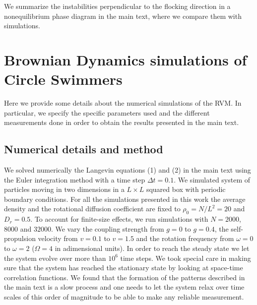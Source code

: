 \documentclass[aps,twocolumn,showlabels,showrefs,amsmath,amssymb,pre,superscriptaddress, floatfix, colors]{revtex4}
\newcommand{\1}{\begin{equation}}
\newcommand{\2}{\end{equation}}
\newcommand{\4}[2]{{\frac{#1}{#2}}}
\begin{document}
We summarize the instabilities perpendicular to the flocking direction in a nonequilibrium phase diagram in the main text, where we compare them with simulations. 





\section{Brownian Dynamics simulations of Circle Swimmers}

Here we provide some details about the numerical simulations of the RVM. In particular, we specify the specific parameters used and the different measurements done in order to obtain the results presented in the main text.

\subsection{Numerical details and method}

We solved numerically the Langevin equations (1) and (2) in the main text using the Euler integration method with a time step $\Delta t=0.1$. We simulated system of particles moving in two dimensions in a $L\times L$ squared box with periodic boundary conditions.  For all the simulations presented in this work the average density and the rotational diffusion coefficient are fixed to $\rho_0=N/L^2=20$ and $D_r=0.5$.
To account for finite-size effects, we run simulations with $N=2000$, $8000$ and $32000$. We vary the coupling strength from $g=0$ to $g=0.4$, the self-propulsion velocity from $v=0.1$ to $v=1.5$ and the rotation frequency from $\omega=0$ to $\omega=2$ ($\Omega=4$ in adimensional units).  In order to reach the steady state we let the system evolve over more than $10^6$ time steps. We took special care in making sure that the system has reached the stationary state by looking at space-time correlation functions. We found that the formation of the patterns described in the main text is a slow process and one needs to let the system relax over time scales of this order of magnitude to be able to make any reliable measurement.  
\end{document}
